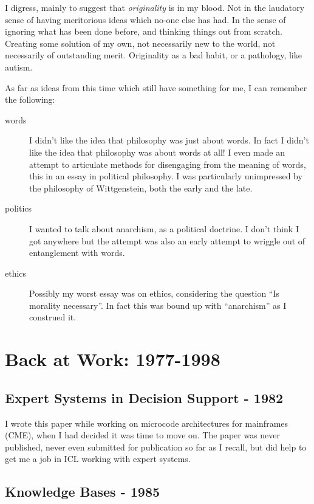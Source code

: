I digress, mainly to suggest that {\it originality} is in my blood.
Not in the laudatory sense of having meritorious ideas which no-one else has had.
In the sense of ignoring what has been done before, and thinking things out from scratch.
Creating some solution of my own, not necessarily new to the world, not necessarily of outstanding merit.
Originality as a bad habit, or a pathology, like autism.

As far as ideas from this time which still have something for me, I can remember the following:

\begin{description}

\item[words]
I didn't like the idea that philosophy was just about words.
In fact I didn't like the idea that philosophy was about words at all!
I even made an attempt to articulate methods for disengaging from the meaning of words, this in an essay in political philosophy.
I was particularly unimpressed by the philosophy of Wittgenstein, both the early and the late.

\item[politics]
I wanted to talk about anarchism, as a political doctrine.
I don't think I got anywhere but the attempt was also an early attempt to wriggle out of entanglement with words.

\item[ethics]
Possibly my worst essay was on ethics, considering the question ``Is morality necessary''.
In fact this was bound up with ``anarchism'' as I construed it.

\end{description}

\chapter{Back at Work: 1977-1998}

\section{Expert Systems in Decision Support - 1982}\label{1982}

I wrote this paper while working on microcode architectures for mainframes (CME), when I had decided it was time to move on.
The paper was never published, never even submitted for publication so far as I recall, but did help to get me a job in ICL working with expert systems.

\section{Knowledge Bases - 1985}


